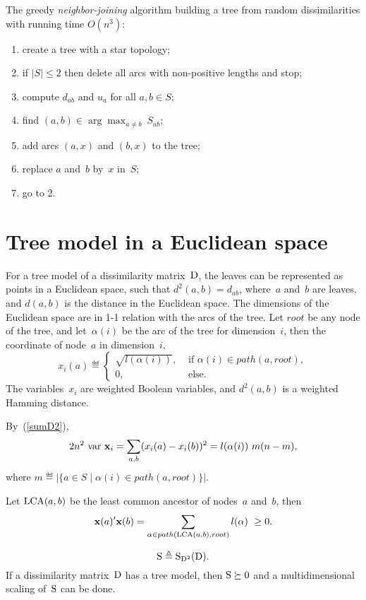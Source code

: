 \documentclass[10pt,a4paper]{article}
\theoremstyle{plain} \newtheorem{Lem}{Lemma}
\begin{document}
The greedy {\em neighbor-joining} algorithm building a tree from random dissimilarities
with running time $O\left(n^3\right)$:
\begin{enumerate}
  \item create a tree with a star topology;
  \item if $|S| \le 2$ then delete all arcs with non-positive lengths and stop;
  \item compute $d_{ab}$ and $u_a$ for all $a,b \in S$;
  \item find $(a,b) \in \arg \max_{a \ne b} \ S_{ab}$;
  \item add arcs $(a,x)$ and $(b,x)$ to the tree;
  \item replace $a$ and~$b$ by~$x$ in~$S$;
  \item go to 2.
\end{enumerate}


\section{Tree model in a Euclidean space}
For a tree model of a dissimilarity matrix~$\mathrm D$, the leaves can be represented as points in a Euclidean space,
such that $d^2(a,b) = d_{ab}$,
where~$a$ and~$b$ are leaves,
and $d(a,b)$ is the distance in the Euclidean space.
The dimensions of the Euclidean space are in 1-1 relation with the arcs of the tree.
Let $root$ be any node of the tree,
and let~$\alpha(i)$ be the arc of the tree for dimension~$i$,
then the coordinate of node~$a$ in dimension~$i$,
\begin{equation*}
x_i(a) \eqdef
\begin{cases}
\sqrt{l(\alpha(i))}, &\text{ if } \alpha(i) \in path(a,root),\\
0,   &\text{ else.}
\end{cases}
\end{equation*}
The variables~$x_i$ are weighted Boolean variables,
and $d^2(a,b)$ is a weighted Hamming distance.

By~(\ref{sumD2}),
$$ 2 n^2 \ \mathrm {var} \  \mathbf x_i = \sum_{a,b} (x_i(a) - x_i(b))^2 = l(\alpha(i)) \ m (n - m), $$
where $m \eqdef |\{a \in S \mid \alpha(i) \in path(a,root)\}|$.

Let $\mathrm {LCA}(a,b)$ be the least common ancestor of nodes~$a$ and~$b$, then
$$ \mathbf x(a)' \mathbf x(b) = \sum_{\alpha \in path(\mathrm {LCA}(a,b),root)} l(\alpha) \ \ge 0. $$

$$ \mathrm S \triangleq \mathrm S_{\mathrm D^2}(\mathrm D). $$
If a dissimilarity matrix~$\mathrm D$ has a tree model, then $\mathrm S \succeq 0$ and a multidimensional scaling of~$\mathrm S$ can be done.
\end{document}

